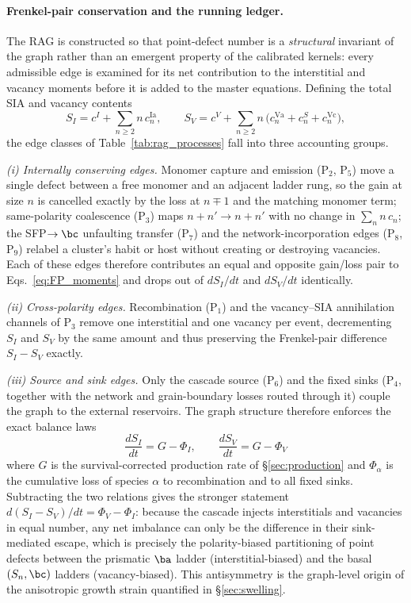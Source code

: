 \paragraph{Frenkel-pair conservation and the running ledger.}
The \textsc{RAG} is constructed so that point-defect number is a
\emph{structural} invariant of the graph rather than an emergent property
of the calibrated kernels: every admissible edge is examined for its net
contribution to the interstitial and vacancy moments before it is added to
the master equations. Defining the total SIA and vacancy contents
\begin{equation}\label{eq:FP_moments}
  S_I=c^{I}+\sum_{n\ge2}n\,c_n^{\mathrm{Ia}},\qquad
  S_V=c^{V}+\sum_{n\ge2}n\,\bigl(c_n^{\mathrm{Va}}+c_n^{S}+c_n^{\mathrm{Vc}}\bigr),
\end{equation}
the edge classes of Table~\ref{tab:rag_processes} fall into three accounting groups.

\emph{(i) Internally conserving edges.} Monomer capture and emission
($\mathrm{P}_2$, $\mathrm{P}_5$) move a single defect between a free monomer
and an adjacent ladder rung, so the gain at size $n$ is cancelled exactly by
the loss at $n\!\mp\!1$ and the matching monomer term; same-polarity
coalescence ($\mathrm{P}_3$) maps $n+n'\!\to\!n{+}n'$ with no change in
$\sum_n n\,c_n$; the SFP$\to\bc$ unfaulting transfer ($\mathrm{P}_7$) and the
network-incorporation edges ($\mathrm{P}_8$, $\mathrm{P}_9$) relabel a cluster's
habit or host without creating or destroying vacancies. Each of these edges
therefore contributes an equal and opposite gain/loss pair to
Eqs.~\eqref{eq:FP_moments} and drops out of $dS_I/dt$ and $dS_V/dt$ identically.

\emph{(ii) Cross-polarity edges.} Recombination ($\mathrm{P}_1$) and the
vacancy--SIA annihilation channels of $\mathrm{P}_3$ remove one interstitial
and one vacancy per event, decrementing $S_I$ and $S_V$ by the same amount and
thus preserving the Frenkel-pair difference $S_I-S_V$ exactly.

\emph{(iii) Source and sink edges.} Only the cascade source ($\mathrm{P}_6$)
and the fixed sinks ($\mathrm{P}_4$, together with the network and grain-boundary
losses routed through it) couple the graph to the external reservoirs. The
graph structure therefore enforces the exact balance laws
\begin{equation}
\label{eq:mass_FP}
\boxed{\;\frac{dS_I}{dt}=G-\Phi_I,\qquad
        \frac{dS_V}{dt}=G-\Phi_V\;}
\end{equation}
where $G$ is the survival-corrected production rate of
\S\ref{sec:production} and $\Phi_\alpha$ is the cumulative loss of species
$\alpha$ to recombination and to all fixed sinks. Subtracting the two
relations gives the stronger statement $d(S_I-S_V)/dt=\Phi_V-\Phi_I$: because
the cascade injects interstitials and vacancies in equal number, any net
imbalance can only be the difference in their sink-mediated escape, which is
precisely the polarity-biased partitioning of point defects between the
prismatic $\ba$ ladder (interstitial-biased) and the basal $(S_n,\bc)$ ladders
(vacancy-biased). This antisymmetry is the graph-level origin of the
anisotropic growth strain quantified in \S\ref{sec:swelling}.

